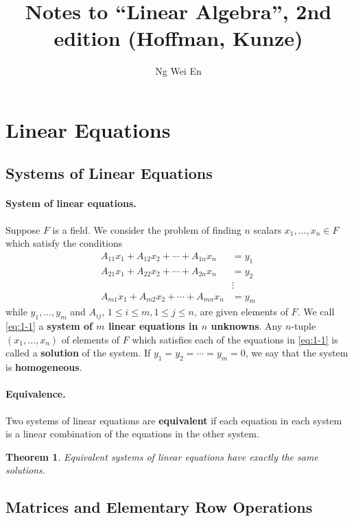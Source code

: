 \documentclass{article}
\title{Notes to ``Linear Algebra'', 2nd edition (Hoffman, Kunze)}
\author{Ng Wei En}
\newtheorem{theorem}{Theorem}
\begin{document}
\maketitle
\tableofcontents
\newpage

\section{Linear Equations}

\setcounter{subsection}{1}
\subsection{Systems of Linear Equations}

\paragraph{System of linear equations.} Suppose $F$ is a field. We consider the
problem of finding $n$ scalars $x_1, \ldots, x_n \in F$ which satisfy the
conditions
\begin{align*}\label{eq:1-1}\tag{1-1}
  A_{11}x_1 + A_{12}x_2 + \cdots + A_{1n}x_n &= y_1 \\
  A_{21}x_1 + A_{22}x_2 + \cdots + A_{2n}x_n &= y_2 \\
  &\vdots \\
  A_{m1}x_1 + A_{m2}x_2 + \cdots + A_{mn}x_n &= y_m
\end{align*}
while $y_1, \ldots, y_m$ and $A_{ij}$, $1 \leq i \leq m, 1 \leq j \leq n$, are
given elements of $F$. We call \eqref{eq:1-1} a \textbf{system of $m$ linear
equations in $n$ unknowns}. Any $n$-tuple $(x_1, \ldots, x_n)$ of elements of
$F$ which satisfies each of the equations in \eqref{eq:1-1} is called a
\textbf{solution} of the system. If $y_1 = y_2 = \cdots = y_m = 0$, we say that
the system is \textbf{homogeneous}.

\paragraph{Equivalence.} Two systems of linear equations are \textbf{equivalent}
if each equation in each system is a linear combination of the equations in the
other system.

\begin{theorem}
  Equivalent systems of linear equations have exactly the same solutions.
\end{theorem}

\subsection{Matrices and Elementary Row Operations}
\end{document}
